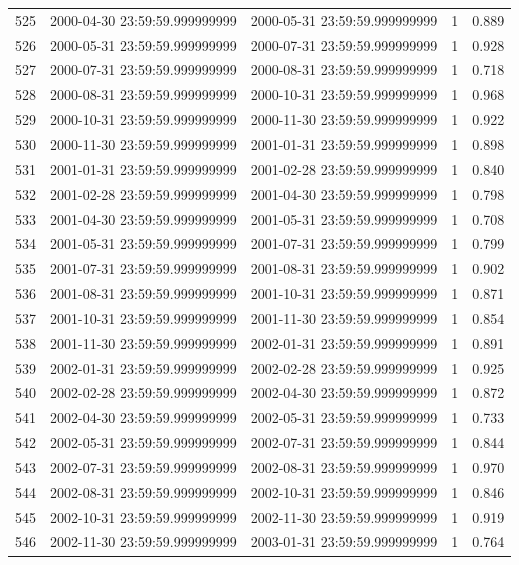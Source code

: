 \begin{table}
\begin{tabular}{lcccc}
525 & 2000-04-30 23:59:59.999999999 & 2000-05-31 23:59:59.999999999 & 1 & 0.889 \\
526 & 2000-05-31 23:59:59.999999999 & 2000-07-31 23:59:59.999999999 & 1 & 0.928 \\
527 & 2000-07-31 23:59:59.999999999 & 2000-08-31 23:59:59.999999999 & 1 & 0.718 \\
528 & 2000-08-31 23:59:59.999999999 & 2000-10-31 23:59:59.999999999 & 1 & 0.968 \\
529 & 2000-10-31 23:59:59.999999999 & 2000-11-30 23:59:59.999999999 & 1 & 0.922 \\
530 & 2000-11-30 23:59:59.999999999 & 2001-01-31 23:59:59.999999999 & 1 & 0.898 \\
531 & 2001-01-31 23:59:59.999999999 & 2001-02-28 23:59:59.999999999 & 1 & 0.840 \\
532 & 2001-02-28 23:59:59.999999999 & 2001-04-30 23:59:59.999999999 & 1 & 0.798 \\
533 & 2001-04-30 23:59:59.999999999 & 2001-05-31 23:59:59.999999999 & 1 & 0.708 \\
534 & 2001-05-31 23:59:59.999999999 & 2001-07-31 23:59:59.999999999 & 1 & 0.799 \\
535 & 2001-07-31 23:59:59.999999999 & 2001-08-31 23:59:59.999999999 & 1 & 0.902 \\
536 & 2001-08-31 23:59:59.999999999 & 2001-10-31 23:59:59.999999999 & 1 & 0.871 \\
537 & 2001-10-31 23:59:59.999999999 & 2001-11-30 23:59:59.999999999 & 1 & 0.854 \\
538 & 2001-11-30 23:59:59.999999999 & 2002-01-31 23:59:59.999999999 & 1 & 0.891 \\
539 & 2002-01-31 23:59:59.999999999 & 2002-02-28 23:59:59.999999999 & 1 & 0.925 \\
540 & 2002-02-28 23:59:59.999999999 & 2002-04-30 23:59:59.999999999 & 1 & 0.872 \\
541 & 2002-04-30 23:59:59.999999999 & 2002-05-31 23:59:59.999999999 & 1 & 0.733 \\
542 & 2002-05-31 23:59:59.999999999 & 2002-07-31 23:59:59.999999999 & 1 & 0.844 \\
543 & 2002-07-31 23:59:59.999999999 & 2002-08-31 23:59:59.999999999 & 1 & 0.970 \\
544 & 2002-08-31 23:59:59.999999999 & 2002-10-31 23:59:59.999999999 & 1 & 0.846 \\
545 & 2002-10-31 23:59:59.999999999 & 2002-11-30 23:59:59.999999999 & 1 & 0.919 \\
546 & 2002-11-30 23:59:59.999999999 & 2003-01-31 23:59:59.999999999 & 1 & 0.764 \\

\end{tabular}
\end{table}
